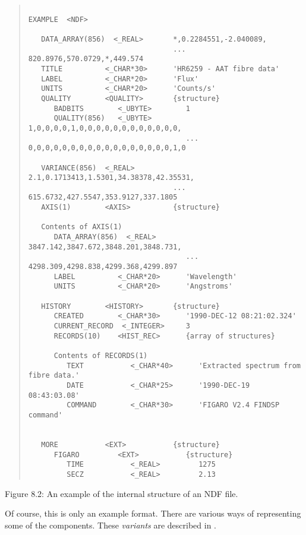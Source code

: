 \begin{quote}

\begin{small}
\begin{verbatim}

EXAMPLE  <NDF>

   DATA_ARRAY(856)  <_REAL>       *,0.2284551,-2.040089,
                                  ... 820.8976,570.0729,*,449.574
   TITLE          <_CHAR*30>      'HR6259 - AAT fibre data'
   LABEL          <_CHAR*20>      'Flux'
   UNITS          <_CHAR*20>      'Counts/s'
   QUALITY        <QUALITY>       {structure}
      BADBITS        <_UBYTE>        1
      QUALITY(856)   <_UBYTE>        1,0,0,0,0,1,0,0,0,0,0,0,0,0,0,0,0,0,
                                     ... 0,0,0,0,0,0,0,0,0,0,0,0,0,0,0,0,0,1,0

   VARIANCE(856)  <_REAL>         2.1,0.1713413,1.5301,34.38378,42.35531,
                                  ... 615.6732,427.5547,353.9127,337.1805
   AXIS(1)        <AXIS>          {structure}

   Contents of AXIS(1)
      DATA_ARRAY(856)  <_REAL>       3847.142,3847.672,3848.201,3848.731,
                                     ... 4298.309,4298.838,4299.368,4299.897
      LABEL          <_CHAR*20>      'Wavelength'
      UNITS          <_CHAR*20>      'Angstroms'

   HISTORY        <HISTORY>       {structure}
      CREATED        <_CHAR*30>      '1990-DEC-12 08:21:02.324'
      CURRENT_RECORD  <_INTEGER>     3
      RECORDS(10)    <HIST_REC>      {array of structures}

      Contents of RECORDS(1)
         TEXT           <_CHAR*40>      'Extracted spectrum from fibre data.'
         DATE           <_CHAR*25>      '1990-DEC-19 08:43:03.08'
         COMMAND        <_CHAR*30>      'FIGARO V2.4 FINDSP command'


   MORE           <EXT>           {structure}
      FIGARO         <EXT>           {structure}
         TIME           <_REAL>         1275
         SECZ           <_REAL>         2.13
\end{verbatim}
\end{small}

\end{quote}
\begin{center}
Figure 8.2: An example of the internal structure of an NDF file.
\end{center}
Of course, this is only an example format.
There are various ways of representing some of the components.
These {\sl variants\/} are described in .

